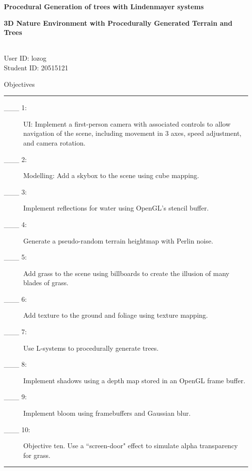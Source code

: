 \documentclass{article}
\newcommand\projecttitle{3D Nature Environment with Procedurally Generated Terrain and Trees}
\newcommand\myname{Liam Ozog}
\newcommand\myuserid{lozog}
\newcommand\mystudentid{20515121}
\begin{document}
	\large\noindent\textbf{Procedural Generation of trees with Lindenmayer systems}
	\normalsize
	\\
\newpage

{\noindent \huge \bf 
	\projecttitle 
}

\medskip
\noindent{Name: \myname} \\ 
User ID: \myuserid \\ 
Student ID: \mystudentid 

\bigskip
{\Large Objectives}

\hrule
\begin{description}
        \item[\_\_\_ 1:]
          UI: Implement a first-person camera with associated controls to allow navigation of the scene, including movement in 3 axes, speed adjustment, and camera rotation.

        \item[\_\_\_ 2:]
		  Modelling: Add a skybox to the scene using cube mapping.

        \item[\_\_\_ 3:]
		  Implement reflections for water using OpenGL's stencil buffer.
			
        \item[\_\_\_ 4:]
		  Generate a pseudo-random terrain heightmap with Perlin noise.

        \item[\_\_\_ 5:]
		  Add grass to the scene using billboards to create the illusion of many blades of grass.

        \item[\_\_\_ 6:]
	      Add texture to the ground and foliage using texture mapping.

        \item[\_\_\_ 7:]
		  Use L-systems to procedurally generate trees.

        \item[\_\_\_ 8:]
		  Implement shadows using a depth map stored in an OpenGL frame buffer.

        \item[\_\_\_ 9:]
		  Implement bloom using framebuffers and Gaussian blur.

        \item[\_\_\_ 10:]
		  Objective ten. Use a ``screen-door" effect to simulate alpha transparency for grass.

\end{description}

\hrule
\end{document}
